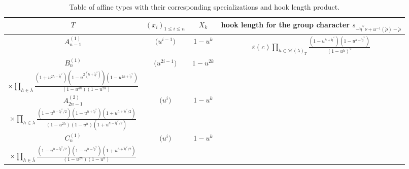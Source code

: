 \documentclass[pdftex]{sigma}
\numberwithin{equation}{section}
\def\cch{\mathcal H}
\begin{document}
\begin{table}[th]\centering\renewcommand{\arraystretch}{1.52}
\caption{Table of affine types with their corresponding specializations and hook length product.}\label{tableau3}

\begin{tabular}{|c|c|c|c|}
\hline
$T$ & $(x_i)_{1\leq i\leq n}$ & $X_k$ & hook length for the group character $s_{-\tilde{\eta}^{\vee }\nu +u^{-1}(\mathring{\rho})-\mathring{\rho}}$\\
\hline
\rule{0pt}{15pt} $A^{(1)}_{n-1}$ & $\bigl(u^{i-1}\bigr)$ & $1-u^k$&
$\varepsilon(c)\displaystyle\prod_{h\in\cch(\lambda)_T} \frac{(1-u^{h+\tilde{\eta}^{\vee}})(1-u^{h-\tilde{\eta}^{\vee}})}{(1-u^h)^2}$\\
\hline
\rule{0pt}{15pt} $B^{(1)}_{n}$& $\bigl(u^{2i-1}\bigr)$ & $1-u^{2k}$&
\makecell{
$\varepsilon(c)\displaystyle u^{-\tilde{\eta}^{\vee}\ell\bigl(\bar{\lambda}\bigr)}\prod_{h\in\cch(\lambda)_T} \frac{(1-u^{2(h-\tilde{\eta}^{\vee})})(1-u^{2(h+\tilde{\eta}^{\vee})})}{(1-u^{2h})^2}$\vspace{1mm}\\ $\displaystyle\times\prod_{h\in\bar{\lambda}}\frac{(1+u^{2h-\tilde{\eta}^{\vee}})(1-u^{2(h+\tilde{\eta}^{\vee})})(1-u^{2h+\tilde{\eta}^{\vee}})}{(1-u^{4h})(1-u^{2h})}$}
\\
\hline
\rule{0pt}{15pt}$A^{(2)}_{2n-1}$ & $\bigl(u^{i}\bigr)$ & $1-u^{k}$&\makecell{
$\varepsilon(c)(-1)^{\ell\bigl(\bar{\lambda}\bigr)}\displaystyle u^{-\ell\bigl(\bar{\lambda}\bigr)\tilde{\eta}^{\vee}/2}\prod_{h\in\cch(\lambda)_T} \frac{(1-u^{h-\tilde{\eta}^{\vee}})(1-u^{h+\tilde{\eta}^{\vee}})}{(1-u^{h})^2}$\vspace{1mm}\\
$\displaystyle \times
\prod_{h\in\bar{\lambda}}\frac{(1-u^{h-\tilde{\eta}^{\vee}/2})(1-u^{h+\tilde{\eta}^{\vee}}) (1+u^{h+\tilde{\eta}^{\vee}/2})}{(1-u^{2h})(1-u^{h})(1+u^{h-\tilde{\eta}^{\vee}/2})}$}
\\
\hline
\rule{0pt}{15pt}$C^{(1)}_{n}$& $\bigl(u^{i}\bigr)$ & $1-u^{k}$&\makecell{
$\displaystyle \varepsilon(c)u^{\ell\bigl(\bar{\lambda}\bigr)\tilde{\eta}^{\vee}/2}
\prod_{h\in\cch(\lambda)_T}\frac{(1-u^{h-\tilde{\eta}^{\vee}})(1-u^{h+\tilde{\eta}^{\vee}})}{(1-u^{h})^2}
$\vspace{1mm}\\  $\displaystyle\times\prod_{h\in\bar{\lambda}}\frac{(1-u^{h-\tilde{\eta}^{\vee}/2})(1-u^{h-\tilde{\eta}^{\vee}})(1+u^{h+\tilde{\eta}^{\vee}/2})}{(1-u^{2h})(1-u^{h})}$}\\

\end{tabular}
\end{table}
\end{document}
